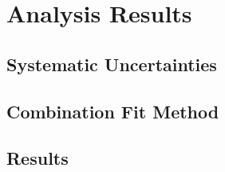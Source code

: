 \chapter{Analysis Results} \label{ch:results}

\section{Systematic Uncertainties}

\section{Combination Fit Method}

\section{Results}
